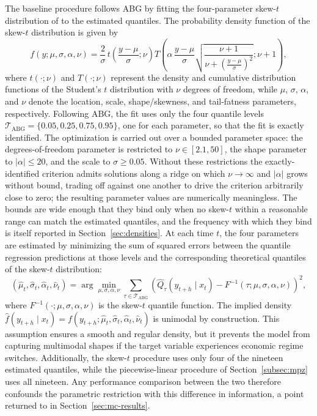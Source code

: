 \documentclass[12pt]{report} %
\begin{document}
The baseline procedure follows ABG by fitting the four-parameter skew-$t$ distribution of \textcite{azzalini2003distributions} to the estimated quantiles. The probability density function of the skew-$t$ distribution is given by
\[
f(y ; \mu, \sigma, \alpha, \nu) = \frac{2}{\sigma} \, t\!\left(\frac{y - \mu}{\sigma}; \nu\right) T\!\left(\alpha \, \frac{y - \mu}{\sigma} \sqrt{\frac{\nu + 1}{\nu + \left(\frac{y - \mu}{\sigma}\right)^2}} ; \nu + 1\right),
\]
where $t(\cdot; \nu)$ and $T(\cdot; \nu)$ represent the density and cumulative distribution functions of the Student's $t$ distribution with $\nu$ degrees of freedom, while $\mu$, $\sigma$, $\alpha$, and $\nu$ denote the location, scale, shape/skewness, and tail-fatness parameters, respectively. Following ABG, the fit uses only the four quantile levels $\mathcal{T}_{\text{ABG}} = \{0.05, 0.25, 0.75, 0.95\}$, one for each parameter, so that the fit is exactly identified. The optimization is carried out over a bounded parameter space: the degrees-of-freedom parameter is restricted to $\nu \in [2.1, 50]$, the shape parameter to $\vert{}\alpha\vert{} \le 20$, and the scale to $\sigma \ge 0.05$. Without these restrictions the exactly-identified criterion admits solutions along a ridge on which $\nu \to \infty$ and $\vert{}\alpha\vert{}$ grows without bound, trading off against one another to drive the criterion arbitrarily close to zero; the resulting parameter values are numerically meaningless. The bounds are wide enough that they bind only when no skew-$t$ within a reasonable range can match the estimated quantiles, and the frequency with which they bind is itself reported in Section~\ref{sec:densities}. At each time $t$, the four parameters are estimated by minimizing the sum of squared errors between the quantile regression predictions at those levels and the corresponding theoretical quantiles of the skew-$t$ distribution:
\[
(\hat{\mu}_t, \hat{\sigma}_t, \hat{\alpha}_t, \hat{\nu}_t) = \arg\min_{\mu, \sigma, \alpha, \nu} \sum_{\tau \in \mathcal{T}_{\text{ABG}}} \left(\hat{Q}_{\tau}(y_{t+h} \mid x_t) - F^{-1}(\tau ; \mu, \sigma, \alpha, \nu)\right)^2,
\]
where $F^{-1}(\cdot; \mu, \sigma, \alpha, \nu)$ is the skew-$t$ quantile function. The implied density $\hat{f}(y_{t+h} \mid x_t) = f(y_{t+h} ; \hat{\mu}_t, \hat{\sigma}_t, \hat{\alpha}_t, \hat{\nu}_t)$ is unimodal by construction. This assumption ensures a smooth and regular density, but it prevents the model from capturing multimodal shapes if the target variable experiences economic regime switches. Additionally, the skew-$t$ procedure uses only four of the nineteen estimated quantiles, while the piecewise-linear procedure of Section~\ref{subsec:mpz} uses all nineteen. Any performance comparison between the two therefore confounds the parametric restriction with this difference in information, a point returned to in Section~\ref{sec:mc-results}.
\end{document}
